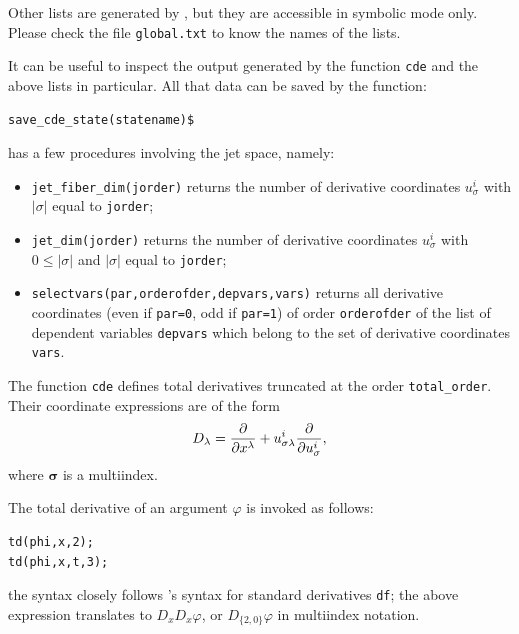 Other lists are generated by \cde, but they are accessible in
\REDUCE symbolic mode only. Please check the file \texttt{global.txt} to know
the names of the lists.

\hypertarget{operator:SAVE_CDE_STATE}{}
It can be useful to inspect the output generated by the function \texttt{cde}
and the above lists in particular.  All that data can be saved by the function:
\begin{verbatim}
save_cde_state(statename)$
\end{verbatim}

\hypertarget{operator:JET_FIBER_DIM}{}
\hypertarget{operator:JET_DIM}{}
\hypertarget{operator:SELECTVARS}{}
\cde has a few procedures involving the jet space, namely:
\begin{itemize}
\item \texttt{jet\_fiber\_dim(jorder)} returns the number of derivative
  coordinates $u^i_\sigma$ with $|\sigma|$ equal to \texttt{jorder};
\item \texttt{jet\_dim(jorder)} returns the number of derivative
  coordinates $u^i_\sigma$ with $0\leq|\sigma|$ and $|\sigma|$ equal to
  \texttt{jorder};
\item \texttt{selectvars(par,orderofder,depvars,vars)} returns all derivative
  coordinates (even if \texttt{par=0}, odd if \texttt{par=1}) of order
  \texttt{orderofder} of the list of dependent variables \texttt{depvars} which
  belong to the set of derivative coordinates \texttt{vars}.
\end{itemize}

The function \texttt{cde} defines total derivatives truncated at the order
\texttt{total\_order}. Their coordinate
expressions are of the form
\begin{equation}
  \label{cdeeq:2}
  D_\lambda=\pd{}{x^\lambda} +
  u^i_{\mathbf{\sigma}\lambda}\pd{}{u^i_{\mathbf{\sigma}}},
\end{equation}
where $\mathbf{\sigma}$ is a multiindex.

The total derivative of an argument $\varphi$ is invoked as follows:
\begin{verbatim}
td(phi,x,2);
td(phi,x,t,3);
\end{verbatim}
the syntax closely follows \REDUCE's syntax for standard derivatives
\texttt{df}; the above expression translates to $D_xD_x\varphi$, or
$D_{\{2,0\}}\varphi$ in multiindex notation.

